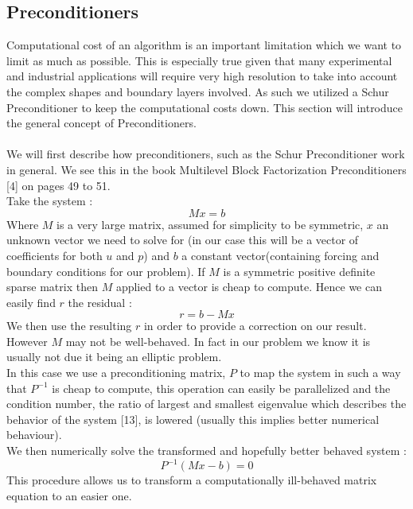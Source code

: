 \documentclass[11pt,twoside,a4paper]{article}
\begin{document}
\subsection{Preconditioners}
Computational cost of an algorithm is an important limitation which we want to limit as much as possible. This is especially true given that many experimental and industrial applications will require very high resolution to take into account the complex shapes and boundary layers involved. As such we utilized a Schur Preconditioner to keep the computational costs down. This section will introduce the general concept of Preconditioners.\\
\\
We will first describe how preconditioners, such as the Schur Preconditioner work in general. We see this in the book Multilevel Block Factorization Preconditioners [4] on pages 49 to 51.\\
Take the system :\\
$$
Mx = b
$$
Where $M$ is a very large matrix, assumed for simplicity to be symmetric, $x$ an unknown vector we need to solve for (in our case this will be a vector of coefficients for both $u$ and $p$) and $b$ a constant vector(containing forcing and boundary conditions for our problem). If $M$ is a symmetric positive definite sparse matrix then $M$ applied to a vector is cheap to compute. Hence we can easily find $r$ the residual :\\
$$
r = b - Mx
$$
We then use the resulting $r$ in order to provide a correction on our result.\\
However $M$ may not be well-behaved. In fact in our problem we know it is usually not due it being an elliptic problem.\\
In this case we use a preconditioning matrix, $P$ to map the system in such a way that $P^{-1}$ is cheap to compute, this operation can easily be parallelized and the condition number, the ratio of largest and smallest eigenvalue which describes the behavior of the system [13], is lowered (usually this implies better numerical behaviour).\\
We then numerically solve the transformed and hopefully better behaved system :
$$
P^{-1}(Mx-b) = 0
$$
This procedure allows us to transform a computationally ill-behaved matrix equation to an easier one.
\end{document}
